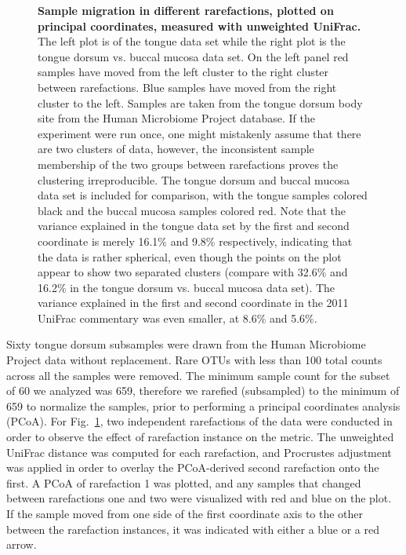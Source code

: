 \documentclass[10pt,letterpaper]{article}
\begin{document}
\begin{figure}[h]
\caption[Sample migration in different rarefactions, plotted on principal coordinates, measured with unweighted UniFrac.]{{\bf Sample migration in different rarefactions, plotted on principal coordinates, measured with unweighted UniFrac.}
The left plot is of the tongue data set while the right plot is the tongue dorsum vs. buccal mucosa data set. On the left panel red samples have moved from the left cluster to the right cluster between rarefactions. Blue samples have moved from the right cluster to the left. Samples are taken from the tongue dorsum body site from the Human Microbiome Project database. If the experiment were run once, one might mistakenly assume that there are two clusters of data, however, the inconsistent sample membership of the two groups between rarefactions proves the clustering irreproducible. The tongue dorsum and buccal mucosa data set is included for comparison, with the tongue samples colored black and the buccal mucosa samples colored red. Note that the variance explained in the tongue data set by the first and second coordinate is merely 16.1\% and 9.8\% respectively, indicating that the data is rather spherical, even though the points on the plot appear to show two separated clusters (compare with 32.6\% and 16.2\% in the tongue dorsum vs. buccal mucosa data set). The variance explained in the first and second coordinate in the 2011 UniFrac commentary \cite{lozupone2011unifrac} was even smaller, at 8.6\% and 5.6\%.}
\label{fig2}
\end{figure}

Sixty tongue dorsum subsamples were drawn from the Human Microbiome Project data without replacement. Rare OTUs with less than 100 total counts across all the samples were removed. The minimum sample count for the subset of 60 we analyzed was 659, therefore we rarefied (subsampled) to the minimum of 659 to normalize the samples, prior to performing a principal coordinates analysis (PCoA). For Fig.~\ref{fig2}, two independent rarefactions of the data were conducted in order to observe the effect of rarefaction instance on the metric. The unweighted UniFrac distance was computed for each rarefaction, and Procrustes adjustment was applied in order to overlay the PCoA-derived second rarefaction onto the first. A PCoA of rarefaction 1 was plotted, and any samples that changed between rarefactions one and two were visualized with red and blue on the plot. If the sample moved from one side of the first coordinate axis to the other between the rarefaction instances, it was indicated with either a blue or a red arrow. 
\end{document}
